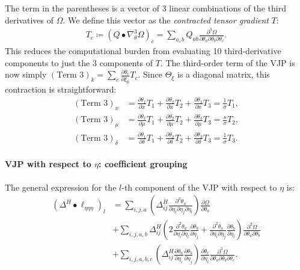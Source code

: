 \documentclass{article}
\begin{document}
%
The term in the parentheses is a vector of 3 linear combinations of the third derivatives of $\Omega$.
We define this vector as the \textit{contracted tensor gradient} $T$:
%
\begin{align}
  T_c \coloneqq (Q \bullet \nabla_\theta^3 \Omega)_c = \sum_{a,b} Q_{ab} \frac{\partial^3 \Omega}{\partial \theta_a \partial \theta_b \partial \theta_c}.
\end{align}
%
This reduces the computational burden from evaluating 10 third-derivative components to just the 3 components of $T$.
The third-order term of the VJP is now simply $(\text{Term 3})_k = \sum_c \frac{\partial \theta_c}{\partial \xi_k} T_c$.
Since $\Theta_\xi$ is a diagonal matrix, this contraction is straightforward:
%
\begin{align}
  (\text{Term 3})_x      & = \frac{\partial \theta_1}{\partial x} T_1 + \frac{\partial \theta_2}{\partial x} T_2 + \frac{\partial \theta_3}{\partial x} T_3 = \frac{1}{\sigma} T_1,                \\
  (\text{Term 3})_\mu    & = \frac{\partial \theta_1}{\partial \mu} T_1 + \frac{\partial \theta_2}{\partial \mu} T_2 + \frac{\partial \theta_3}{\partial \mu} T_3 = \frac{s}{\sigma} T_2,          \\
  (\text{Term 3})_\delta & = \frac{\partial \theta_1}{\partial \delta} T_1 + \frac{\partial \theta_2}{\partial \delta} T_2 + \frac{\partial \theta_3}{\partial \delta} T_3 = \frac{1}{\sigma} T_3.
\end{align}

\paragraph{VJP with respect to $\eta$: coefficient grouping}

The general expression for the $l$-th component of the VJP with respect to $\eta$ is:
%
\begin{align}
  (\Delta^H \bullet \ell_{\eta\eta\eta})_l & = \sum_{i,j,a} \left( \Delta^H_{ij} \frac{\partial^3 \theta_a}{\partial \eta_i \partial \eta_j \partial \eta_l} \right) \frac{\partial \Omega}{\partial \theta_a} \nonumber                                                                                                                                                           \\
                                           & + \sum_{i,j,a,b} \Delta^H_{ij} \left( 2 \frac{\partial^2 \theta_a}{\partial \eta_i \partial \eta_l} \frac{\partial \theta_b}{\partial \eta_j} + \frac{\partial^2 \theta_a}{\partial \eta_i \partial \eta_j} \frac{\partial \theta_b}{\partial \eta_l} \right) \frac{\partial^2 \Omega}{\partial \theta_a \partial \theta_b} \nonumber \\
                                           & + \sum_{i,j,a,b,c} \left( \Delta^H_{ij} \frac{\partial \theta_a}{\partial \eta_i} \frac{\partial \theta_b}{\partial \eta_j} \right) \frac{\partial \theta_c}{\partial \eta_l} \frac{\partial^3 \Omega}{\partial \theta_a \partial \theta_b \partial \theta_c}.
\end{align}
\end{document}
